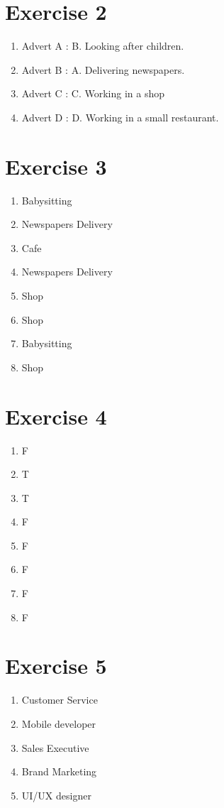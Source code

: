 \documentclass[12pt,titlepage]{article}
\begin{document}
\section*{Exercise 2}
\begin{enumerate}
    \item Advert A : B. Looking after children.
    \item Advert B : A. Delivering newspapers.
    \item Advert C : C. Working in a shop 
    \item Advert D : D. Working in a small restaurant.
\end{enumerate}

\section*{Exercise 3}
\begin{enumerate}
    \item Babysitting
    \item Newspapers Delivery
    \item Cafe
    \item Newspapers Delivery
    \item Shop
    \item Shop
    \item Babysitting
    \item Shop
\end{enumerate}

\section*{Exercise 4}
\begin{enumerate}
    \item F
    \item T
    \item T
    \item F
    \item F
    \item F
    \item F
    \item F
\end{enumerate}

\section*{Exercise 5}
\begin{enumerate}
    \item Customer Service
    \item Mobile developer
    \item Sales Executive
    \item Brand Marketing
    \item UI/UX designer
\end{enumerate}
\end{document}
